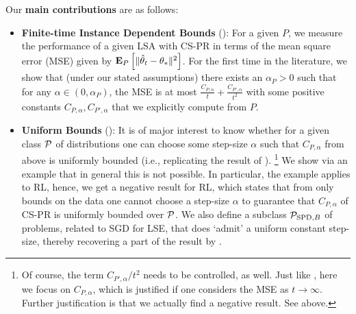 Our \textbf{main contributions} are as follows:
\begin{itemize}[leftmargin=*]%
\item \textbf{Finite-time Instance Dependent Bounds} (): For a given $P$, we  measure the performance of a given LSA with CS-PR in terms of the mean square error (MSE) given by $\EEP{\normsm{\thh_t-\ts}^2}$.
For the first time in the literature,
we show that (under our stated assumptions) there exists an $\alpha_P>0$ such that 
for any $\alpha\in (0,\alpha_P)$,
the MSE %
is at most $\frac{C_{P,\alpha}}{t}+\frac{C_{P',\alpha}}{t^2}$ with some positive constants $C_{P,\alpha},C_{P',\alpha}$ that we explicitly compute from $P$.
\item \textbf{Uniform Bounds} ():
It is of major interest to know whether for a given class $\P$ of distributions 
one can choose some step-size $\alpha$ 
such that $C_{P,\alpha}$ from above is uniformly bounded (i.e., replicating the result of \citet{bach}).%
\footnote{Of course, the term $C_{P',\alpha}/t^2$ needs to be controlled, as well. Just like \citet{bach}, here we focus on $C_{P,\alpha}$, which is justified if one considers the MSE as $t\to\infty$. Further justification is that we actually find a negative result. See above.}
We show via an example that in general this is not possible.
In particular, the example applies to RL, hence, we get a negative result for RL, which states that from only bounds on the data one cannot choose a step-size $\alpha$ to guarantee that $C_{P,\alpha}$ of CS-PR is uniformly bounded over $\P$.
We also define a subclass  $\P_{\text{SPD},B}$ of problems, related to SGD for LSE, that does `admit' a uniform constant step-size, thereby recovering a part of the result by \citet{bach}.

\end{itemize}
